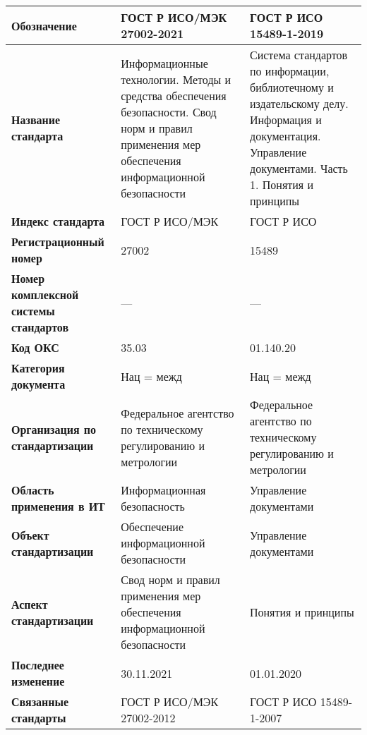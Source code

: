 \begin{table}[h!tp]
	\centering
	\caption{}
	\label{table:national:international}
	\begin{tabular}{|p{10em}|p{12em}|p{12em}|}
		\hline
		\textbf{Обозначение}
			& \textbf{ГОСТ Р ИСО/МЭК 27002-2021}
			& \textbf{ГОСТ Р ИСО 15489-1-2019} \\ \hline
		\textbf{Название стандарта}
			& Информационные технологии. Методы и средства обеспечения безопасности. Свод норм и правил применения мер обеспечения информационной безопасности
			& Система стандартов по информации, библиотечному и издательскому делу. Информация и документация. Управление документами. Часть 1. Понятия и принципы \\ \hline
		\textbf{Индекс стандарта}
			& ГОСТ Р ИСО/МЭК & ГОСТ Р ИСО \\ \hline
		\textbf{Регистрационный номер}
			& 27002 & 15489 \\ \hline
		\textbf{Номер комплексной системы стандартов}
			& --- & --- \\ \hline
		\textbf{Код ОКС}
			& 35.03 & 01.140.20 \\ \hline
		\textbf{Категория документа}
			& Нац = межд & Нац = межд \\ \hline
		\textbf{Организация по стандартизации}
			& Федеральное агентство по техническому регулированию и метрологии
			& Федеральное агентство по техническому регулированию и метрологии \\ \hline
		\textbf{Область применения в ИТ}
			& Информационная безопасность & Управление документами \\ \hline
		\textbf{Объект стандартизации}
			& Обеспечение информационной безопасности
			& Управление документами \\ \hline
		\textbf{Аспект стандартизации}
			& Свод норм и правил применения мер обеспечения информационной безопасности
			& Понятия и принципы \\ \hline
		\textbf{Последнее изменение}
			& 30.11.2021 & 01.01.2020 \\ \hline
		\textbf{Связанные стандарты}
			& ГОСТ Р ИСО/МЭК 27002-2012 & ГОСТ Р ИСО 15489-1-2007 \\ \hline
	\end{tabular}
\end{table}

